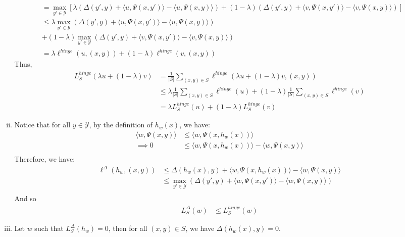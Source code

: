 \documentclass{amsart}
\theoremstyle{definition}
\begin{document}
\begin{enumerate}[(a)]
\begin{enumerate}[(i)]
\begin{align*}
          &= \max_{y' \in \mathcal{Y}} \left[ \lambda (\Delta(y', y) + \langle u, \Psi(x, y') \rangle - \langle u, \Psi(x, y) \rangle) + (1-\lambda)(\Delta(y', y) + \langle v, \Psi(x, y') \rangle - \langle v, \Psi(x, y) \rangle)\right]\\
          &\le \lambda \max_{y' \in \mathcal{Y}} (\Delta(y', y) + \langle u, \Psi(x, y') \rangle - \langle u, \Psi(x, y) \rangle) \\
          &+ (1-\lambda)\max_{y' \in \mathcal{Y}} (\Delta(y', y) + \langle v, \Psi(x, y') \rangle - \langle v, \Psi(x, y) \rangle)\\
          &= \lambda \ell^{hinge}(u, (x,y)) + (1-\lambda) \ell^{hinge}(v, (x,y))
        \end{align*} 
        Thus, 
      \begin{align*}
        L^{hinge}_S(\lambda u + (1-\lambda) v) &= \frac{1}{|S|} \sum_{(x, y) \in S} \ell^{hinge}(\lambda u + (1-\lambda) v, (x,y))\\
        &\le \lambda \frac{1}{|S|} \sum_{(x, y) \in S} \ell^{hinge}(u) + (1-\lambda) \frac{1}{|S|} \sum_{(x, y) \in S} \ell^{hinge}(v)\\
        &= \lambda L^{hinge}_S(u) + (1-\lambda) L^{hinge}_S(v)
      \end{align*}
      \item
        Notice that for all $y \in \mathcal{Y}$, by the definition of $h_w(x)$, we have:
        \begin{align*}
          \langle w, \Psi(x, y) \rangle & \le \langle w , \Psi(x, h_w(x)) \rangle \\
          \implies 0 & \le \langle w , \Psi(x, h_w(x)) \rangle -\langle w, \Psi(x, y) \rangle  \\
        \end{align*}
        Therefore, we have:
        \begin{align*}
          \ell^\Delta(h_w, (x,y)) &\le \Delta(h_w(x), y) + \langle w , \Psi(x, h_w(x)) \rangle - \langle w, \Psi(x, y) \rangle \\
          &\le \max_{y' \in \mathcal{Y}} (\Delta(y', y) + \langle w , \Psi(x, y') \rangle - \langle w, \Psi(x, y) \rangle)\\
        \end{align*}
        And so 
        \begin{align*}
          L_S^{\Delta}(w) &\le L_S^{hinge}(w)
        \end{align*}
      \item
        Let $w$ such that $L_S^{\Delta}(h_w) = 0$, then for all $(x,y) \in S$, we have $\Delta(h_w(x), y) = 0$. 

\end{enumerate}
\end{enumerate}
\end{document}
